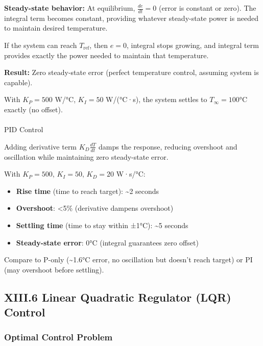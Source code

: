 \documentclass[
]{article}
\makeatletter
\let\oldparagraph\paragraph
\renewcommand{\paragraph}{
    \@ifstar
      \xxxParagraphStar
      \xxxParagraphNoStar
  }
\newcommand{\xxxParagraphStar}[1]{\oldparagraph*{#1}\mbox{}}
\newcommand{\xxxParagraphNoStar}[1]{\oldparagraph{#1}\mbox{}}
\providecommand{\tightlist}{%
  \setlength{\itemsep}{0pt}\setlength{\parskip}{0pt}}
\makeatother
\begin{document}
\textbf{Steady-state behavior:} At equilibrium, \(\frac{de}{dt} = 0\)
(error is constant or zero). The integral term becomes constant,
providing whatever steady-state power is needed to maintain desired
temperature.

If the system can reach \(T_{\text{ref}}\), then \(e = 0\), integral
stops growing, and integral term provides exactly the power needed to
maintain that temperature.

\textbf{Result:} Zero steady-state error (perfect temperature control,
assuming system is capable).

With \(K_P = 500\) W/°C, \(K_I = 50\) W/(°C·s), the system settles to
\(T_{\infty} = 100°\)C exactly (no offset).

\paragraph{PID Control}\label{pid-control}

Adding derivative term \(K_D \frac{dT}{dt}\) damps the response,
reducing overshoot and oscillation while maintaining zero steady-state
error.

With \(K_P = 500\), \(K_I = 50\), \(K_D = 20\) W·s/°C:

\begin{itemize}
\tightlist
\item
  \textbf{Rise time} (time to reach target): \textasciitilde2 seconds
\item
  \textbf{Overshoot}: \textless5\% (derivative dampens overshoot)
\item
  \textbf{Settling time} (time to stay within ±1°C): \textasciitilde5
  seconds
\item
  \textbf{Steady-state error}: 0°C (integral guarantees zero offset)
\end{itemize}

Compare to P-only (\textasciitilde1.6°C error, no oscillation but
doesn't reach target) or PI (may overshoot before settling).

\subsection{XIII.6 Linear Quadratic Regulator (LQR)
Control}\label{xiii.6-linear-quadratic-regulator-lqr-control}

\subsubsection{Optimal Control Problem}\label{optimal-control-problem}
\end{document}
